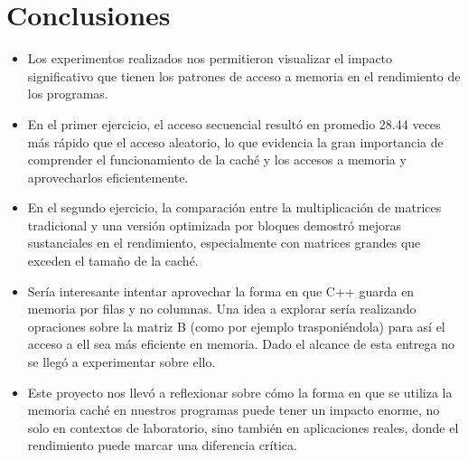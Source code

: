 \documentclass{article}
\begin{document}
\section{Conclusiones}
\begin{itemize}[noitemsep]
    \item Los experimentos realizados nos permitieron visualizar el impacto significativo que tienen los patrones de acceso a memoria en el rendimiento de los programas.
    
    \item En el primer ejercicio, el acceso secuencial resultó en promedio 28.44 veces más rápido que el acceso aleatorio, lo que evidencia la gran importancia de comprender el funcionamiento de la caché y los accesos a memoria y aprovecharlos eficientemente.
    
    \item En el segundo ejercicio, la comparación entre la multiplicación de matrices tradicional y una versión optimizada por bloques demostró mejoras sustanciales en el rendimiento, especialmente con matrices grandes que exceden el tamaño de la caché.

    \item Sería interesante intentar aprovechar la forma en que C++ guarda en memoria por filas y no columnas. Una idea a explorar sería realizando opraciones sobre la matriz B (como por ejemplo trasponiéndola) para así el acceso a ell sea más eficiente en memoria. Dado el alcance de esta entrega no se llegó a experimentar sobre ello.
    
    \item Este proyecto nos llevó a reflexionar sobre cómo la forma en que se utiliza la memoria caché en nuestros programas puede tener un impacto enorme, no solo en contextos de laboratorio, sino también en aplicaciones reales, donde el rendimiento puede marcar una diferencia crítica.
\end{itemize}
\end{document}
